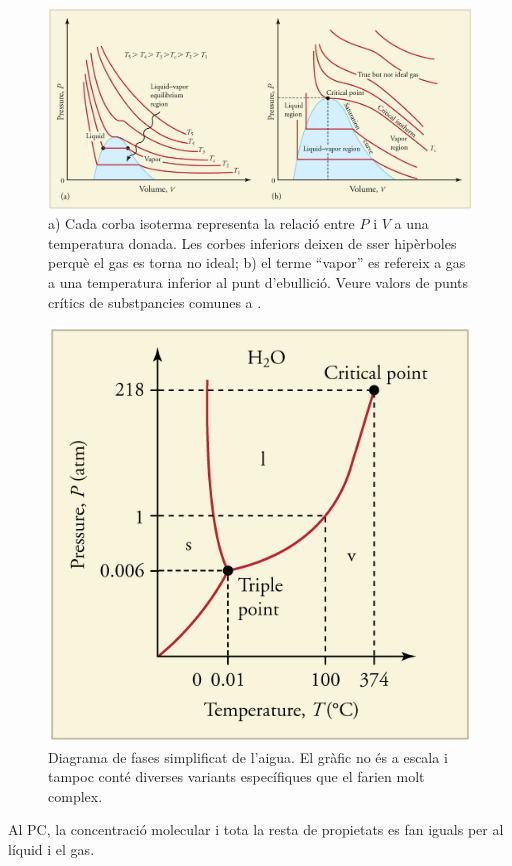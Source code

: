 \begin{figure}[h]
\centering
\includegraphics[scale=0.6]{figures/punt_critic.png}
\caption[Punt crític]{a) Cada corba isoterma representa la relació entre $P$ i $V$ a una temperatura donada. Les corbes inferiors deixen de sser hipèrboles perquè el gas es torna no ideal; b) el terme ``vapor'' es refereix a gas a una temperatura inferior al punt d'ebullició. Veure valors de punts crítics de substpancies comunes a .\cite{Phase2018}}
\label{fig:punt_critic}
\end{figure}


\begin{figure}[h]
\centering
\includegraphics[scale=0.8]{figures/WaterPD.png}
\caption[Diagrama de fases simplificat de l'aigua]{Diagrama de fases simplificat de l'aigua. El gràfic no és a escala i tampoc conté diverses variants específiques que el farien molt complex.\cite{Phase2018}}
\label{fig:WaterPD}
\end{figure}
Al PC, la concentració molecular i tota la resta de propietats es fan iguals per al líquid i el gas.

